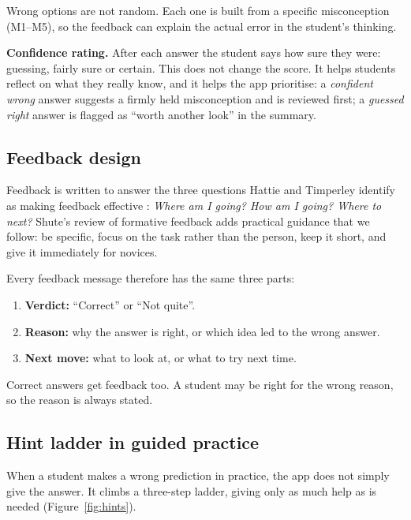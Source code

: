 \documentclass[11pt,a4paper]{article}
\begin{document}
Wrong options are not random. Each one is built from a specific misconception (M1--M5), so the
feedback can explain the actual error in the student's thinking.

\textbf{Confidence rating.} After each answer the student says how sure they were: guessing,
fairly sure or certain. This does not change the score. It helps students reflect on what they
really know, and it helps the app prioritise: a \emph{confident wrong} answer suggests a firmly held
misconception and is reviewed first; a \emph{guessed right} answer is flagged as ``worth another
look'' in the summary.

\subsection{Feedback design}

Feedback is written to answer the three questions Hattie and Timperley identify as making feedback
effective \cite{hattie2007}: \emph{Where am I going? How am I going? Where to next?} Shute's review of
formative feedback \cite{shute2008} adds practical guidance that we follow: be specific, focus on the
task rather than the person, keep it short, and give it immediately for novices.

Every feedback message therefore has the same three parts:

\begin{enumerate}
  \item \textbf{Verdict:} ``Correct'' or ``Not quite''.
  \item \textbf{Reason:} why the answer is right, or which idea led to the wrong answer.
  \item \textbf{Next move:} what to look at, or what to try next time.
\end{enumerate}

Correct answers get feedback too. A student may be right for the wrong reason, so the reason is
always stated.

\subsection{Hint ladder in guided practice}
\label{sec:hints}

When a student makes a wrong prediction in practice, the app does not simply give the answer. It
climbs a three-step ladder, giving only as much help as is needed (Figure~\ref{fig:hints}).
\end{document}
